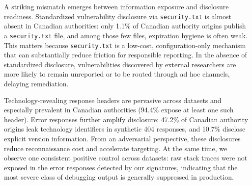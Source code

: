 \documentclass[a4paper,fleqn]{cas-sc}
\begin{document}
    A striking mismatch emerges between information exposure and disclosure readiness. 
    Standardized vulnerability disclosure via \texttt{security.txt} is almost absent in Canadian authorities: only 1.1\% of Canadian authority origins publish a \texttt{security.txt} file, and among those few files, expiration hygiene is often weak. 
    This matters because \texttt{security.txt} is a low-cost, configuration-only mechanism that can substantially reduce friction for responsible reporting. 
    In the absence of standardized disclosure, vulnerabilities discovered by external researchers are more likely to remain unreported or to be routed through ad hoc channels, delaying remediation.

    Technology-revealing response headers are pervasive across datasets and especially prevalent in Canadian authorities (94.4\% expose at least one such header). 
    Error responses further amplify disclosure: 47.2\% of Canadian authority origins leak technology identifiers in synthetic 404 responses, and 10.7\% disclose explicit version information. 
    From an adversarial perspective, these disclosures reduce reconnaissance cost and accelerate targeting. 
    At the same time, we observe one consistent positive control across datasets: raw stack traces were not exposed in the error responses detected by our signatures, indicating that the most severe class of debugging output is generally suppressed in production.
\end{document}
